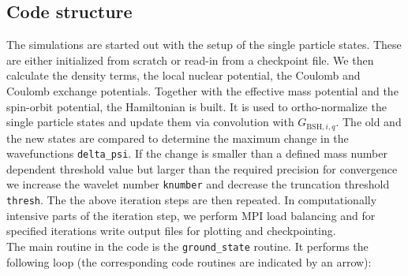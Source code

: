 \documentclass[4p]{elsarticle}
\begin{document}
\subsection{Code structure}
The simulations are started out with the setup of the single particle states. These are either initialized from scratch or read-in from a checkpoint file. We then calculate the density terms, the local nuclear potential, the Coulomb and Coulomb exchange potentials. Together with the effective mass potential and the spin-orbit potential, the Hamiltonian is built. It is used to ortho-normalize the single particle states and update them via convolution with $G_{\mathrm{BSH},{i,q}}$. The old and the new states are compared to determine the maximum change in the wavefunctions \texttt{delta\_psi}. If the change is smaller than a defined mass number dependent threshold value but larger than the required precision for convergence we increase the wavelet number \texttt{knumber} and decrease the truncation threshold \texttt{thresh}. The the above iteration steps are then repeated. In computationally intensive parts of the iteration step, we perform MPI load balancing and for specified iterations write output files for plotting and checkpointing.\\
The main routine in the code is the \texttt{ground\_state} routine. It performs the following loop (the corresponding code routines are indicated by an arrow):
\end{document}
